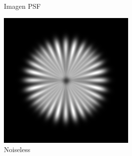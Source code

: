 \documentclass{./packages/optica-article}
\begin{document}
\begin{figure}[hbp]
\begin{center}
\begin{subfigure}[t]{0.4\textwidth}
			\caption{Imagen PSF}\label{fig:psf}
		\end{subfigure}
		\caption{Imagen usada para la simulación con Deconvolutionlab2 y Image J, y el PSF del sistema de captura simulado}\label{fig:image:ref-psf}

	\end{center}
	\begin{center}
		\begin{subfigure}[t]{0.25\textwidth}\centering
			\centering
			\includegraphics[width=\textwidth]{Simulation deconvolution/ref_conv}
			\caption{Noiseless}\label{fig:sim:conv}
		\end{subfigure}
		\quad
		\begin{subfigure}[t]{0.25\textwidth}\centering
			\centering

\end{subfigure}
\end{center}
\end{figure}
\end{document}
